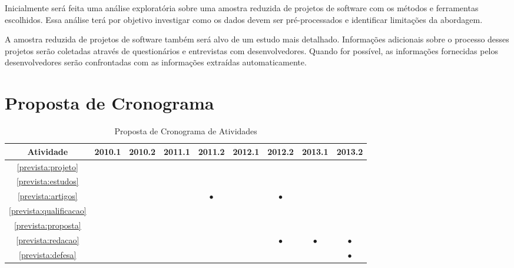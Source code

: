 \documentclass{article}
\newcommand{\newrow}{\\\hline}
\newcommand{\x}{$\bullet$}
\begin{document}
Inicialmente será feita uma análise exploratória sobre uma amostra reduzida de
projetos de software com os métodos e ferramentas escolhidos. Essa análise terá
por objetivo investigar como os dados devem ser pré-processados e identificar
limitações da abordagem.

A amostra reduzida de projetos de software também será alvo de um estudo mais
detalhado. Informações adicionais sobre o processo desses projetos serão
coletadas através de questionários e entrevistas com desenvolvedores. Quando
for possível, as informações fornecidas pelos desenvolvedores serão
confrontadas com as informações extraídas automaticamente. 



\section{Proposta de Cronograma}

\begin{table}[h]
  \centering
  \begin{tabular}{|c|c|c|c|c|c|c|c|c|} \hline
    Atividade                   & 2010.1 & 2010.2 & 2011.1 & 2011.2  & 2012.1 & 2012.2  & 2013.1 & 2013.2 \newrow
    \ref{prevista:projeto}      &        &        &        &         &        &         &        &        \newrow
    \ref{prevista:estudos}      &        &        &        &         &        &         &        &        \newrow
    \ref{prevista:artigos}      &        &        &        & \x      &        & \x      &        &        \newrow
    \ref{prevista:qualificacao} &        &        &        &         &        &         &        &        \newrow
    \ref{prevista:proposta}     &        &        &        &         &        &         &        &        \newrow
    \ref{prevista:redacao}      &        &        &        &         &        & \x      & \x     & \x     \newrow
    \ref{prevista:defesa}       &        &        &        &         &        &         &        & \x     \newrow
  \end{tabular}
 \caption{Proposta de Cronograma de Atividades}
 \label{tab:cronograma}
\end{table}




\end{document}
